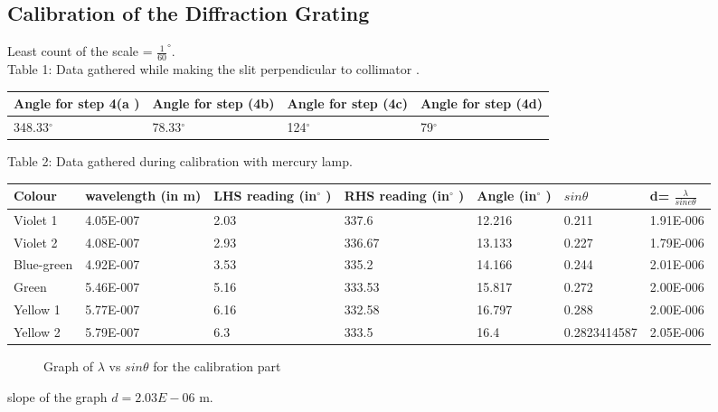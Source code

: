 \documentclass[11pt]{article}
\begin{document}
\subsection{Calibration of the Diffraction Grating}
Least count of the scale = $\frac{1}{60}^{\circ}$.\\
Table 1: Data gathered while making the slit perpendicular to collimator .

\begin{table}[h]
\begin{tabular}{|l|l|l|l|}
\hline
Angle for step 4(a )& Angle for step (4b) & Angle for step (4c) & Angle for step (4d) \\
\hline
348.33$^{\circ}$            & 78.33$^{\circ}$             & 124$^{\circ}$               & 79$^{\circ}$             \\
\hline
\end{tabular}
\end{table}
Table 2: Data gathered during calibration with mercury lamp.\\
\begin{table}[h]
\begin{tabular}{|p{1.5cm}|p{2cm}|p{2cm}|p{2cm}|l|l|l|}
\hline
Colour     & wavelength (in m) & LHS reading (in$^{\circ}$ )         & RHS reading (in$^{\circ}$ )        & Angle (in$^{\circ}$ )       & $sin\theta$        & d= $\frac{\lambda}{sine\theta}$ \\
\hline
Violet 1   & 4.05E-007  & 2.03 & 337.6       & 12.216 & 0.211 & 1.91E-006   \\
Violet 2   & 4.08E-007  & 2.93 & 336.67 & 13.133 & 0.227 & 1.79E-006   \\
Blue-green & 4.92E-007  & 3.53 & 335.2       & 14.166 & 0.244 & 2.01E-006   \\
Green      & 5.46E-007  & 5.16 & 333.53 & 15.817 & 0.272 & 2.00E-006   \\
Yellow 1   & 5.77E-007  & 6.16 & 332.58 & 16.797 & 0.288 & 2.00E-006   \\
Yellow 2   & 5.79E-007  & 6.3         & 333.5       & 16.4        & 0.2823414587 & 2.05E-006  \\ \hline
\end{tabular}
\end{table}

\begin{figure}[H]
\caption{Graph of $\lambda$ vs $sin\theta$ for the calibration part}\par\medskip
{}
\end{figure}
slope of the graph $d = 2.03E-06$ m.\\
\end{document}
